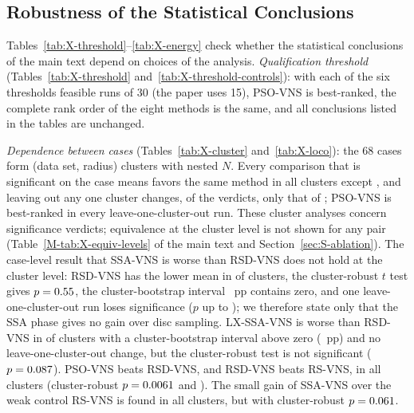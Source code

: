 \documentclass[10pt]{article}
\begin{document}
\FloatBarrier
\subsection{Robustness of the Statistical Conclusions}
\label{sec:S-inference}
Tables~\ref{tab:X-threshold}--\ref{tab:X-energy} check whether the statistical conclusions of the main text depend on choices of the analysis. \emph{Qualification threshold} (Tables~\ref{tab:X-threshold} and~\ref{tab:X-threshold-controls}): with each of the six thresholds \NXThrList{} feasible runs of 30 (the paper uses 15), PSO-VNS is best-ranked, the complete rank order of the eight methods is the same, and all \NXThrNConcl{} conclusions listed in the tables are unchanged. %

\emph{Dependence between cases} (Tables~\ref{tab:X-cluster} and~\ref{tab:X-loco}): the 68 cases form \NXClusters{} (data set, radius) clusters with nested $N$. Every comparison that is significant on the case means favors the same method in all \NXClusters{} clusters except \NXClCaseSigNotUnanimous{}, and leaving out any one cluster changes, of the \NXLocoNPairs{} verdicts, only that of \NXLocoChanged{}; PSO-VNS is best-ranked in every leave-one-cluster-out run. These cluster analyses concern significance verdicts; equivalence at the cluster level is not shown for any pair (Table~\ref{M-tab:X-equiv-levels} of the main text and Section~\ref{sec:S-ablation}). %
The case-level result that SSA-VNS is worse than RSD-VNS does not hold at the cluster level: RSD-VNS has the lower mean in \NXClSSAVNSvsRSDVNSOpp{} of \NXClustersNum{} clusters, the cluster-robust $t$ test gives $p=0.55$, the cluster-bootstrap interval \NXClSSAVNSvsRSDVNSCI~pp contains zero, and one leave-one-cluster-out run loses significance ($p$ up to \NXLocoSSAVNSvsRSDVNSPMax); we therefore state only that the SSA phase gives no gain over disc sampling. LX-SSA-VNS is worse than RSD-VNS in \NXClLXSSAVNSvsRSDVNSOpp{} of \NXClustersNum{} clusters with a cluster-bootstrap interval above zero (\NXClLXSSAVNSvsRSDVNSCI~pp) and no leave-one-cluster-out change, but the cluster-robust test is not significant ($p=0.087$). PSO-VNS beats RSD-VNS, and RSD-VNS beats RS-VNS, in all \NXClusters{} clusters (cluster-robust $p=0.0061$ and \NXClRSDVNSvsRSVNSCRP). The small gain of SSA-VNS over the weak control RS-VNS is found in all clusters, but with cluster-robust $p=0.061$. %
\end{document}
